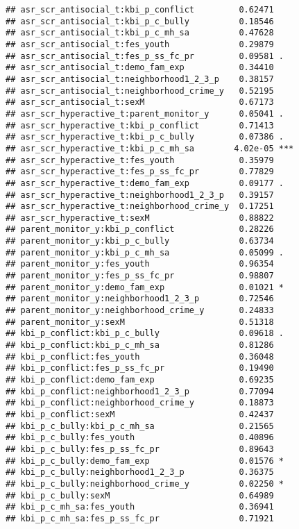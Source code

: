 \documentclass[
]{article}
\begin{document}
\begin{verbatim}
## asr_scr_antisocial_t:kbi_p_conflict         0.62471    
## asr_scr_antisocial_t:kbi_p_c_bully          0.18546    
## asr_scr_antisocial_t:kbi_p_c_mh_sa          0.47628    
## asr_scr_antisocial_t:fes_youth              0.29879    
## asr_scr_antisocial_t:fes_p_ss_fc_pr         0.09581 .  
## asr_scr_antisocial_t:demo_fam_exp           0.34410    
## asr_scr_antisocial_t:neighborhood1_2_3_p    0.38157    
## asr_scr_antisocial_t:neighborhood_crime_y   0.52195    
## asr_scr_antisocial_t:sexM                   0.67173    
## asr_scr_hyperactive_t:parent_monitor_y      0.05041 .  
## asr_scr_hyperactive_t:kbi_p_conflict        0.71413    
## asr_scr_hyperactive_t:kbi_p_c_bully         0.07386 .  
## asr_scr_hyperactive_t:kbi_p_c_mh_sa        4.02e-05 ***
## asr_scr_hyperactive_t:fes_youth             0.35979    
## asr_scr_hyperactive_t:fes_p_ss_fc_pr        0.77829    
## asr_scr_hyperactive_t:demo_fam_exp          0.09177 .  
## asr_scr_hyperactive_t:neighborhood1_2_3_p   0.39157    
## asr_scr_hyperactive_t:neighborhood_crime_y  0.17251    
## asr_scr_hyperactive_t:sexM                  0.88822    
## parent_monitor_y:kbi_p_conflict             0.28226    
## parent_monitor_y:kbi_p_c_bully              0.63734    
## parent_monitor_y:kbi_p_c_mh_sa              0.05099 .  
## parent_monitor_y:fes_youth                  0.96354    
## parent_monitor_y:fes_p_ss_fc_pr             0.98807    
## parent_monitor_y:demo_fam_exp               0.01021 *  
## parent_monitor_y:neighborhood1_2_3_p        0.72546    
## parent_monitor_y:neighborhood_crime_y       0.24833    
## parent_monitor_y:sexM                       0.51318    
## kbi_p_conflict:kbi_p_c_bully                0.09618 .  
## kbi_p_conflict:kbi_p_c_mh_sa                0.81286    
## kbi_p_conflict:fes_youth                    0.36048    
## kbi_p_conflict:fes_p_ss_fc_pr               0.19490    
## kbi_p_conflict:demo_fam_exp                 0.69235    
## kbi_p_conflict:neighborhood1_2_3_p          0.77094    
## kbi_p_conflict:neighborhood_crime_y         0.18873    
## kbi_p_conflict:sexM                         0.42437    
## kbi_p_c_bully:kbi_p_c_mh_sa                 0.21565    
## kbi_p_c_bully:fes_youth                     0.40896    
## kbi_p_c_bully:fes_p_ss_fc_pr                0.89643    
## kbi_p_c_bully:demo_fam_exp                  0.01576 *  
## kbi_p_c_bully:neighborhood1_2_3_p           0.36375    
## kbi_p_c_bully:neighborhood_crime_y          0.02250 *  
## kbi_p_c_bully:sexM                          0.64989    
## kbi_p_c_mh_sa:fes_youth                     0.36941    
## kbi_p_c_mh_sa:fes_p_ss_fc_pr                0.71921    

\end{verbatim}
\end{document}
